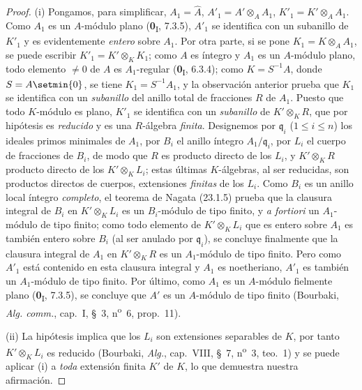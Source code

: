 \begin{proof}
(i) Pongamos, para simplificar, $A_1=\widehat A$,
$A'_1=A'\otimes_AA_1$, $K'_1=K'\otimes_AA_1$. Como $A_1$ es un
$A$-módulo plano (\textbf{0}\textsubscript{I}, 7.3.5), $A'_1$ se identifica con un
subanillo de $K'_1$ y es evidentemente \emph{entero} sobre $A_1$. Por otra parte, si
se pone $K_1=K\otimes_AA_1$, se puede escribir
$K'_1=K'\otimes_KK_1$; como $A$ es íntegro y $A_1$ es un $A$-módulo
plano, todo elemento $\neq0$ de $A$ es $A_1$-regular
(\textbf{0}\textsubscript{I}, 6.3.4); como $K=S^{-1}A$, donde $S=A\setmin\{0\}$, se tiene
$K_1=S^{-1}A_1$, y la observación anterior prueba que $K_1$ se identifica con un
\emph{subanillo} del anillo total de fracciones $R$ de $A_1$. Puesto que todo
$K$-módulo es plano, $K'_1$ se identifica con un \emph{subanillo} de $K'\otimes_KR$,
que por hipótesis es \emph{reducido} y es una $R$-álgebra \emph{finita}. Designemos por
$\mathfrak q_i$ ($1\leqslant i\leqslant n$) los ideales primos minimales de
$A_1$, por $B_i$ el anillo íntegro $A_1/\mathfrak q_i$, por $L_i$ el cuerpo de
fracciones de $B_i$, de modo que $R$ es producto directo de los $L_i$, y
$K'\otimes_KR$ producto directo de los $K'\otimes_KL_i$; estas últimas
$K$-álgebras, al ser reducidas, son productos directos de cuerpos,
extensiones \emph{finitas} de los $L_i$. Como $B_i$ es un anillo local íntegro
\emph{completo}, el teorema de Nagata (23.1.5) prueba que la clausura
integral de $B_i$ en $K'\otimes_KL_i$ es un $B_i$-módulo de tipo finito, y
\emph{a fortiori} un $A_1$-módulo de tipo finito; como todo elemento de
$K'\otimes_KL_i$ que es entero sobre $A_1$ es también entero sobre $B_i$ (al ser
anulado por $\mathfrak q_i$), se concluye finalmente que la clausura
integral de $A_1$ en $K'\otimes_KR$ es un $A_1$-módulo de tipo finito. Pero
como $A'_1$ está contenido en esta clausura integral y $A_1$ es
noetheriano, $A'_1$ es también un $A_1$-módulo de tipo finito. Por último, como $A_1$
es un $A$-módulo fielmente plano (\textbf{0}\textsubscript{I}, 7.3.5), se concluye
que $A'$ es un $A$-módulo de tipo finito (Bourbaki, \emph{Alg. comm.},
cap.~I, §~3, n\textsuperscript{o}~6, prop.~11).


(ii) La hipótesis implica que los $L_i$ son extensiones separables
de $K$, por tanto $K'\otimes_KL_i$ es reducido (Bourbaki, \emph{Alg.}, cap.~VIII,
§~7, n\textsuperscript{o}~3, teo.~1) y se puede aplicar (i) a \emph{toda}
extensión finita $K'$ de $K$, lo que demuestra nuestra afirmación.
\end{proof}

